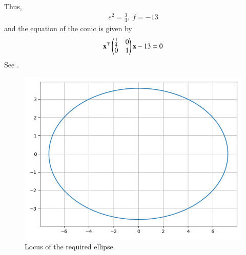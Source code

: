     Thus,
    \begin{align}
        e^2 = \frac{3}{4},\ f = -13
    \end{align}
    and the equation of the conic is given by
    \begin{align}
        \mathbf{x}^\top\begin{pmatrix}\frac{1}{4}&0\\0&1\end{pmatrix}\mathbf{x} - 13 = 0
    \end{align}
    See .
    \begin{figure}[!ht]
        \centering
        \includegraphics[width=\columnwidth]{chapters/11/11/3/20/figs/ellipse.png}
        \caption{Locus of the required ellipse.}
        \label{fig:chapters/11/11/3/20/ellipse}
    \end{figure}
